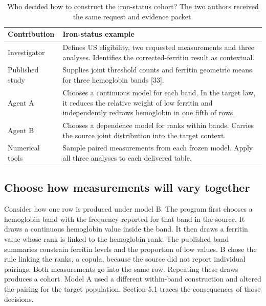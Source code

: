 \documentclass[sigconf,review]{acmart}
\begin{document}
\begin{table}[tp]

\caption{Who decided how to construct the iron-status cohort? The two authors received the same request and evidence packet.}

\label{tab:1}

\centering\small

\renewcommand{\arraystretch}{1.12}

\begin{tabularx}{\textwidth}{@{}>{\raggedright\arraybackslash}p{}>{\raggedright\arraybackslash}X@{}}

\toprule

Contribution & Iron-status example \\

\midrule

Investigator & Defines US eligibility, two requested measurements and three analyses. Identifies the corrected-ferritin result as contextual. \\

Published study & Supplies joint threshold counts and ferritin geometric means for three hemoglobin bands [33]. \\

Agent A & Chooses a continuous model for each band. In the target law, it reduces the relative weight of low ferritin and independently redraws hemoglobin in one fifth of rows. \\

Agent B & Chooses a dependence model for ranks within bands. Carries the source joint distribution into the target context. \\

Numerical tools & Sample paired measurements from each frozen model. Apply all three analyses to each delivered table. \\

\bottomrule

\end{tabularx}

\end{table}

\subsection{Choose how measurements will vary together}

Consider how one row is produced under model B. The program first chooses a hemoglobin band with the frequency reported for that band in the source. It draws a continuous hemoglobin value inside the band. It then draws a ferritin value whose rank is linked to the hemoglobin rank. The published band summaries constrain ferritin levels and the proportion of low values. B chose the rule linking the ranks, a copula, because the source did not report individual pairings. Both measurements go into the same row. Repeating these draws produces a cohort. Model A used a different within-band construction and altered the pairing for the target population. Section 5.1 traces the consequences of those decisions.
\end{document}
